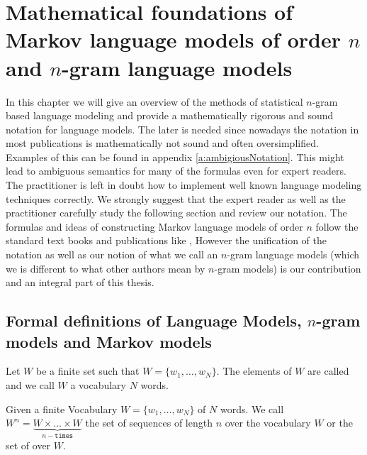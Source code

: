 \documentclass[•]{book}
\begin{document}

\chapter{Mathematical foundations of Markov language models of order $n$ and $n$-gram language models}
In this chapter we will give an overview of the methods of statistical $n$-gram based language modeling and provide a mathematically rigorous and sound notation for language models. 
The later is needed since nowadays the notation in most publications is mathematically not sound and often oversimplified. Examples of this can be found in appendix \ref{a:ambigiousNotation}.
This might lead to ambiguous semantics for many of the formulas even for expert readers. 
The practitioner is left in doubt how to implement well known language modeling techniques correctly. 
We strongly suggest that the expert reader as well as the practitioner carefully study the following section and review our notation. 
The formulas and ideas of constructing Markov language models of order $n$ follow the standard text books and publications like \cite{chen:goodman},  
However the unification of the notation as well as our notion of what we call an $n$-gram language models (which we is different to what other authors mean by $n$-gram models) is our contribution and an integral part of this thesis. 

\section{Formal definitions of Language Models, $n$-gram models and Markov models}\label{sec:basicDefinitions}
\begin{definition}
Let $W$ be a finite set such that $W = \{w_1,\dots,w_N\}$. The elements of $W$ are called  and we call $W$ a \gls{vocabulary} $N$ words.
\end{definition}

\begin{definition}
Given a finite Vocabulary $W = \{w_1,\dots,w_N\}$ of $N$ words. 
We call $W^{n}=\underbrace{W\times \dots\times W}_{n-\texttt{times}}$ the set of sequences of length $n$ over the vocabulary $W$ or the set of  over $W$. 
\end{definition}
\end{document}
